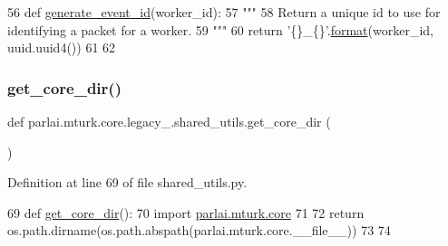 \begin{DoxyCode}
56 \textcolor{keyword}{def }\hyperlink{namespaceparlai_1_1mturk_1_1core_1_1shared__utils_aba2e4d48063dafc80e931f8925dbb755}{generate\_event\_id}(worker\_id):
57     \textcolor{stringliteral}{"""}
58 \textcolor{stringliteral}{    Return a unique id to use for identifying a packet for a worker.}
59 \textcolor{stringliteral}{    """}
60     \textcolor{keywordflow}{return} \textcolor{stringliteral}{'\{\}\_\{\}'}.\hyperlink{namespaceparlai_1_1mturk_1_1core_1_1shared__utils_afcac728e96b38bbad8cde6f7be4f613e}{format}(worker\_id, uuid.uuid4())
61 
62 
\end{DoxyCode}
\mbox{\label{namespaceparlai_1_1mturk_1_1core_1_1legacy__2018_1_1shared__utils_a46db6c6ce07c08b84777eaf63cf50608}} 
\subsubsection{\texorpdfstring{get\+\_\+core\+\_\+dir()}{get\_core\_dir()}}
{\footnotesize\ttfamily def parlai.\+mturk.\+core.\+legacy\+\_.\+shared\+\_\+utils.\+get\+\_\+core\+\_\+dir (\begin{DoxyParamCaption}{ }\end{DoxyParamCaption})}



Definition at line 69 of file shared\+\_\+utils.\+py.


\begin{DoxyCode}
69 \textcolor{keyword}{def }\hyperlink{namespaceparlai_1_1mturk_1_1core_1_1shared__utils_ac4e340ccc66c691fdd294c734dae0c5d}{get\_core\_dir}():
70     \textcolor{keyword}{import} \hyperlink{namespaceparlai_1_1mturk_1_1core}{parlai.mturk.core}
71 
72     \textcolor{keywordflow}{return} os.path.dirname(os.path.abspath(parlai.mturk.core.\_\_file\_\_))
73 
74 
\end{DoxyCode}
\mbox{\label{namespaceparlai_1_1mturk_1_1core_1_1legacy__2018_1_1shared__utils_ad4874994d87b965b1bc462e1d55aadd3}} 
